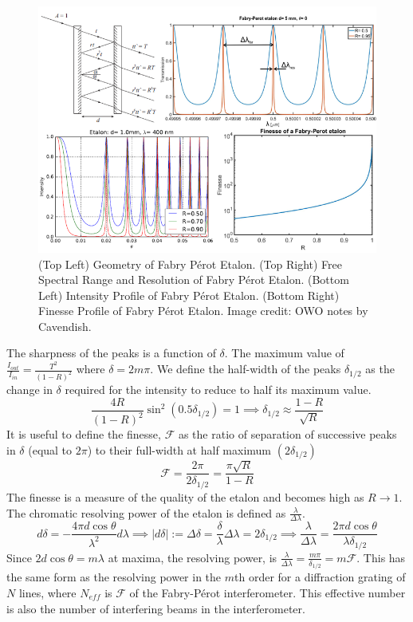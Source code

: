 \documentclass[a4paper]{article}
\begin{document}
\begin{figure}[H]
    \centering
    \includegraphics[width=\linewidth]{fabryperot.PNG}
    \caption{(Top Left) Geometry of Fabry Pérot Etalon. (Top Right) Free Spectral Range and Resolution of Fabry Pérot Etalon. (Bottom Left) Intensity Profile of Fabry Pérot Etalon. (Bottom Right) Finesse Profile of Fabry Pérot Etalon. Image credit: OWO notes by Cavendish.}
\end{figure}
\newpage
\begin{Note}
The sharpness of the peaks is a function of $\delta$. The maximum value of $\frac{I_{out}}{I_{in}}=\frac{T^2}{(1-R)^2}$ where $\delta=2m\pi$. We define the half-width of the peaks $\delta_{1/2}$ as the change in $\delta$ required for the intensity to reduce to half its maximum value.
$$\frac{4R}{(1-R)^2}\sin^2(0.5\delta_{1/2})=1\implies\delta_{1/2}\approx\frac{1-R}{\sqrt{R}}$$
It is useful to define the finesse, $\mathcal{F}$ as the ratio of separation of successive peaks in $\delta$ (equal to $2\pi$) to their full-width at half maximum $(2\delta_{1/2})$
$$\mathcal{F}=\frac{2\pi}{2\delta_{1/2}}=\frac{\pi\sqrt{R}}{1-R}$$
The finesse is a measure of the quality of the etalon and becomes high as $R\rightarrow 1$. The chromatic resolving power of the etalon is defined as $\frac{\lambda}{\Delta\lambda}$.
$$d\delta=-\frac{4\pi d\cos\theta}{\lambda^2}d\lambda\implies|d\delta|:=\Delta\delta=\frac{\delta}{\lambda}\Delta\lambda=2\delta_{1/2}\implies\frac{\lambda}{\Delta\lambda}=\frac{2\pi d\cos\theta}{\lambda\delta_{1/2}}$$
Since $2d\cos\theta=m\lambda$ at maxima, the resolving power, is $\frac{\lambda}{\Delta\lambda}=\frac{m\pi}{\delta_{1/2}}=m\mathcal{F}$. This has the same form as the resolving power in the $m$th order for a diffraction grating of $N$ lines, where $N_{eff}$ is $\mathcal{F}$ of the Fabry-Pérot interferometer. This effective number is also the number of interfering beams in the interferometer.
\end{Note}
\end{document}

